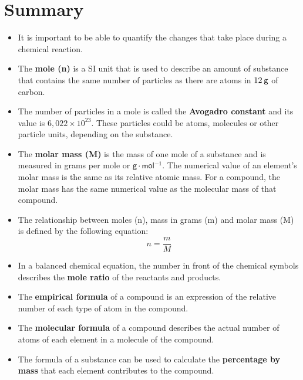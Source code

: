             \section{Summary}
            \nopagebreak
      \label{m38712*id285735}\begin{itemize}[noitemsep]
            \label{m38712*uid107}\item It is important to be able to quantify the changes that take place during a chemical reaction.
\label{m38712*uid108}\item The \textbf{mole (n)} is a SI unit that is used to describe an amount of substance that contains the same number of particles as there are atoms in $12\phantom{\rule{2pt}{0ex}}\mathsf{g}$ of carbon.
\label{m38712*uid109}\item The number of particles in a mole is called the \textbf{Avogadro constant} and its value is $6,022\ensuremath{\times}{10}^{23}$. These particles could be atoms, molecules or other particle units, depending on the substance.
\label{m38712*uid110}\item The \textbf{molar mass (M)} is the mass of one mole of a substance and is measured in grams per mole or $\mathsf{g}\ensuremath{\cdot}\mathsf{mol}{}^{-1}$. The numerical value of an element's molar mass is the same as its relative atomic mass. For a compound, the molar mass has the same numerical value as the molecular mass of that compound.
\label{m38712*uid111}\item The relationship between moles (n), mass in grams (m) and molar mass (M) is defined by the following equation:
\label{m38712*id285862}\nopagebreak\noindent{}
    \begin{equation}
    n=\frac{m}{M}
      \end{equation}
    \label{m38712*uid112}\item In a balanced chemical equation, the number in front of the chemical symbols describes the \textbf{mole ratio} of the reactants and products.
\label{m38712*uid113}\item The \textbf{empirical formula} of a compound is an expression of the relative number of each type of atom in the compound.
\label{m38712*uid114}\item The \textbf{molecular formula} of a compound describes the actual number of atoms of each element in a molecule of the compound.
\label{m38712*uid115}\item The formula of a substance can be used to calculate the \textbf{percentage by mass} that each element contributes to the compound.

\end{itemize}
